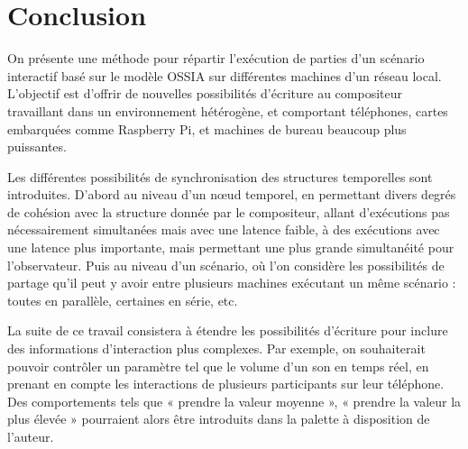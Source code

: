 \documentclass[10pt]{article}
\newcommand\ossia{OSSIA\xspace}
\begin{document}





\section{Conclusion}
On présente une méthode pour répartir l'exécution de parties d'un scénario interactif basé sur le modèle \ossia sur différentes machines d'un réseau local. 
L'objectif est d'offrir de nouvelles possibilités d'écriture au compositeur travaillant dans un environnement hétérogène, et comportant téléphones, cartes embarquées comme Raspberry Pi, et machines de bureau beaucoup plus puissantes.

Les différentes possibilités de synchronisation des structures temporelles sont introduites. 
D'abord au niveau d'un nœud temporel, en permettant divers degrés de cohésion avec la structure donnée par le compositeur, allant d'exécutions pas nécessairement simultanées mais avec une latence faible, à des exécutions avec une latence plus importante, mais permettant une plus grande simultanéité pour l'observateur.
Puis au niveau d'un scénario, où l'on considère les possibilités de partage qu'il peut y avoir entre plusieurs machines exécutant un même scénario : toutes en parallèle, certaines en série, etc.

La suite de ce travail consistera à étendre les possibilités d'écriture pour inclure des informations d'interaction plus complexes.
Par exemple, on souhaiterait pouvoir contrôler un paramètre tel que le volume d'un son en temps réel, en prenant en compte les interactions de plusieurs participants sur leur téléphone. 
Des comportements tels que « prendre la valeur moyenne », « prendre la valeur la plus élevée » pourraient alors être introduits dans la palette à disposition de l'auteur.
\end{document}
